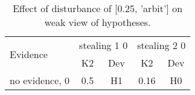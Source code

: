 \begin{table}\begin{tabular}{l|cc|cc}\toprule\multirow{2}{*}{Evidence} & \multicolumn{2}{c}{stealing 1 0}& \multicolumn{2}{c}{stealing 2 0}\\& {K2} & {Dev}& {K2} & {Dev}\\\midrule
no evidence, 0 & \cellcolor{Bittersweet}0.5&\cellcolor{Bittersweet}H1&\cellcolor{Bittersweet}0.16&\cellcolor{Bittersweet}H0\\\bottomrule\end{tabular}\caption{Effect of disturbance of [0.25, 'arbit'] on weak view of hypotheses.}\end{table}